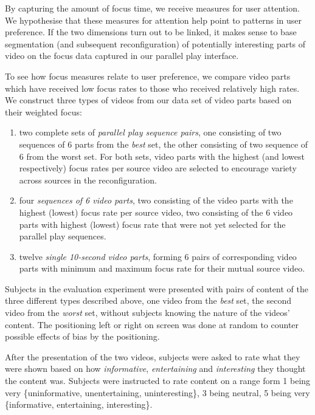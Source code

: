 By capturing the amount of focus time, we receive measures for user attention. We hypothesise that these measures for attention help point to patterns in user preference. If the two dimensions turn out to be linked, it makes sense to base segmentation (and subsequent reconfiguration) of potentially interesting parts of video on the focus data captured in our parallel play interface.

To see how focus measures relate to user preference, we compare video parts which have received low focus rates to those who received relatively high rates. We construct three types of videos from our data set of video parts based on their weighted focus:
\begin{enumerate}
  \item two complete sets of \emph{parallel play sequence pairs}, one consisting of two sequences of 6 parts from the \emph{best} set, the other consisting of two sequence of 6 from the worst set. For both sets, video parts with the highest (and lowest respectively) focus rates per source video are selected to encourage variety across sources in the reconfiguration.
  \item four \emph{sequences of 6 video parts}, two consisting of the video parts with the highest (lowest) focus rate per source video, two consisting of the 6 video parts with highest (lowest) focus rate that were not yet selected for the parallel play sequences.
  \item twelve \emph{single 10-second video parts}, forming 6 pairs of corresponding video parts with minimum and maximum focus rate for their mutual source video.
\end{enumerate}

Subjects in the evaluation experiment were presented with pairs of content of the three different types described above, one video from the \emph{best} set, the second video from the \emph{worst} set, without subjects knowing the nature of the videos' content. The positioning left or right on screen was done at random to counter possible effects of bias by the positioning. 

After the presentation of the two videos, subjects were asked to rate what they were shown based on how \emph{informative}, \emph{entertaining} and \emph{interesting} they thought the content was. Subjects were instructed to rate content on a range form 1 being very \{uninformative, unentertaining, uninteresting\}, 3 being neutral, 5 being very \{informative, entertaining, interesting\}. 


